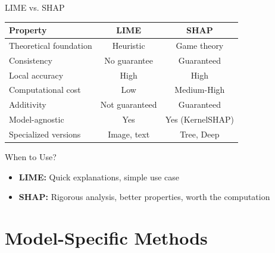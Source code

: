 \documentclass[aspectratio=169]{beamer}
\begin{document}
\begin{frame}{LIME vs. SHAP}
  \begin{center}
  \begin{tabular}{lcc}
    \toprule
    \textbf{Property} & \textbf{LIME} & \textbf{SHAP} \\
    \midrule
    Theoretical foundation & Heuristic & Game theory \\
    Consistency & No guarantee & Guaranteed \\
    Local accuracy & High & High \\
    Computational cost & Low & Medium-High \\
    Additivity & Not guaranteed & Guaranteed \\
    Model-agnostic & Yes & Yes (KernelSHAP) \\
    Specialized versions & Image, text & Tree, Deep \\
    \bottomrule
  \end{tabular}
  \end{center}

  \vspace{1em}

  \begin{block}{When to Use?}
    \begin{itemize}
      \item \textbf{LIME:} Quick explanations, simple use case
      \item \textbf{SHAP:} Rigorous analysis, better properties, worth the computation
    \end{itemize}
  \end{block}
\end{frame}

\section{Model-Specific Methods}
\end{document}
